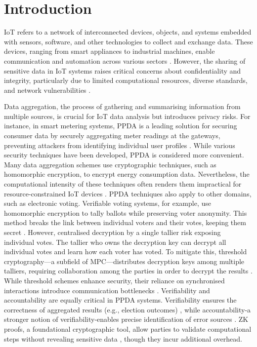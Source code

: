 \chapter{Introduction}

\ac{IoT} refers to a network of interconnected devices, objects, and systems embedded with sensors, software, and other technologies to collect and exchange data. These devices, ranging from smart appliances to industrial machines, enable communication and automation across various sectors \cite[1]{combinatorial}. However, the sharing of sensitive data in \ac{IoT} systems raises critical concerns about confidentiality and integrity, particularly due to limited computational resources, diverse standards, and network vulnerabilities \cite[1]{smpc}.

Data aggregation, the process of gathering and summarising information from multiple sources, is crucial for \ac{IoT} data analysis but introduces privacy risks. For instance, in smart metering systems, \ac{PPDA} is a leading solution for securing consumer data by securely aggregating meter readings at the gateways, preventing attackers from identifying individual user profiles \cite[2]{ppda-fog}. While various security techniques have been developed, \ac{PPDA} is considered more convenient. Many data aggregation schemes use cryptographic techniques, such as homomorphic encryption, to encrypt energy consumption data. Nevertheless, the computational intensity of these techniques often renders them impractical for resource-constrained \ac{IoT} devices \cite[113-114]{smart-meter}. \ac{PPDA} techniques also apply to other domains, such as electronic voting. Verifiable voting systems, for example, use homomorphic encryption to tally ballots while preserving voter anonymity. This method breaks the link between individual voters and their votes, keeping them secret \cite[53]{stuve-study}. However, centralised decryption by a single tallier risk exposing individual votes. The tallier who owns the decryption key can decrypt all individual votes and learn how each voter has voted. To mitigate this, threshold cryptography---a subfield of \ac{MPC}---distributes decryption keys among multiple talliers, requiring collaboration among the parties in order to decrypt the results \cite[40]{stuve-study}. While threshold schemes enhance security, their reliance on synchronised interactions introduce communication bottlenecks \cite[45]{stuve-study}. Verifiability and accountability are equally critical in \ac{PPDA} systems. Verifiability ensures the correctness of aggregated results (e.g., election outcomes) \cite[4]{stuve-study}, while accountability-a stronger notion of verifiability-enables precise identification of error sources \cite[10, 27]{stuve-study}. \ac{ZK} proofs, a foundational cryptographic tool, allow parties to validate computational steps without revealing sensitive data \cite[13]{stuve-study}, though they incur additional overhead. 

